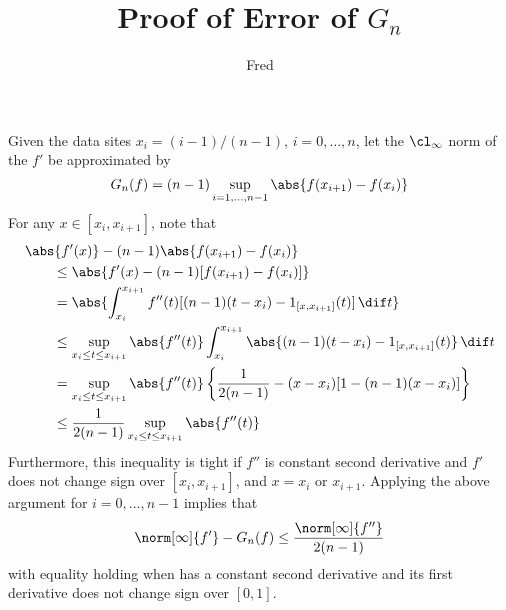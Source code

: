 \documentclass[]{elsarticle}
\begin{document}
\begin{frontmatter}

\title{Proof of Error of $G_n$}
\author{Fred}

\end{frontmatter}

Given the data sites $x_i=(i-1)/(n-1)$, $i=0, \ldots, n$, let the $\cl_\infty$ norm of the $f'$ be approximated by
\[
G_n(f) = (n-1) \sup_{i=1, \ldots, n-1} \abs{f(x_{i+1})-f(x_i)}
\]
For any $x \in [x_{i}, x_{i+1}]$, note that 
\begin{align*}
\MoveEqLeft{\abs{f'(x)} - (n-1) \abs{f(x_{i+1})-f(x_i)}} \\
 & \le \abs{f'(x) - (n-1)[f(x_{i+1})-f(x_i)]} \\
&=\abs{ \int_{x_i}^{x_{i+1}} f''(t) [(n-1)(t-x_i) -  1_{[x,x_{i+1}]}(t)] \, \dif t} \\
& \le \sup_{x_i \le t \le x_{i+1}} \abs{f''(t)} \int_{x_i}^{x_{i+1}} \abs{  (n-1)(t-x_i) -  1_{[x,x_{i+1}]}(t)} \, \dif t \\
&=\sup_{x_i \le t \le x_{i+1}} \abs{f''(t)} \left \{\frac{1}{2(n-1)} - (x-x_i)[1-(n-1)(x-x_i)] \right\} \\
&\le \frac{1}{2(n-1)}\sup_{x_i \le t \le x_{i+1}} \abs{f''(t)}
\end{align*}
Furthermore, this inequality is tight if $f''$ is constant second derivative and $f'$ does not change sign over $[x_{i}, x_{i+1}]$, and $x=x_i$ or $x_{i+1}$.  Applying the above argument for $i=0, \ldots, n-1$ implies that
\[
\norm[\infty]{f'} - G_n(f) \le \frac{\norm[\infty]{f''}}{2(n-1)}
\]
with equality holding when has a constant second derivative and its first derivative does not change sign over $[0,1]$.
\end{document}
